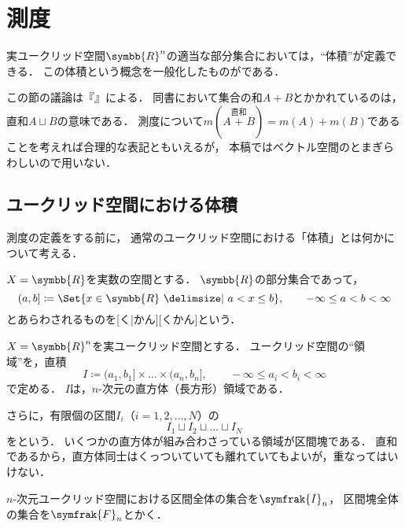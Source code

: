 \documentclass[../sotsu.tex]{subfiles}
\begin{document}
\section{測度}
\label{sec:measure}

実ユークリッド空間$\symbb{R}^n$の適当な部分集合においては，``体積''が定義できる．
この体積という概念を一般化したものがである．

この節の議論は\citeauthor{ito-lebesgue-1963}『』による．
同書において集合の和$A + B$とかかれているのは，直和$A \sqcup B$の意味である．
測度について$m(A \overset{直和}{+} B) = m(A) + m(B)$であることを考えれば合理的な表記ともいえるが，
本稿ではベクトル空間のとまぎらわしいので用いない．


\subsection{ユークリッド空間における体積}

測度の定義をする前に，
通常のユークリッド空間における「体積」とは何かについて考える．

$X = \symbb{R}$を実数の空間とする．
$\symbb{R}$の部分集合であって，
\begin{equation}
    \label{eq:interval-example}
    (a, b] \coloneq \Set{  x \in \symbb{R}  \given  a < x \leq b  },
    \qquad -\infty \leq a < b < \infty
\end{equation}
とあらわされるものを[く|かん][くかん]という\cite{ito-lebesgue-1963}．

$X = \symbb{R}^n$を実ユークリッド空間とする．
ユークリッド空間の``領域''を，直積
\begin{equation}
    I \coloneq (a_1, b_1] \times \dots \times (a_n, b_n],
    \qquad -\infty \leq a_i < b_i < \infty
\end{equation}
で定める．
$I$は，$n$-次元の直方体（長方形）領域である．

さらに，有限個の区間$I_i$（$i = 1, 2, \dots, N$）の
\begin{equation}
    I_1 \sqcup I_2 \sqcup \dots \sqcup I_N
\end{equation}
をという．
いくつかの直方体が組み合わさっている領域が区間塊である．
直和であるから，直方体同士はくっついていても離れていてもよいが，重なってはいけない．

$n$-次元ユークリッド空間における区間全体の集合を$\symfrak{I}_n$，
区間塊全体の集合を$\symfrak{F}_n$とかく\cite{ito-lebesgue-1963}．
\end{document}
